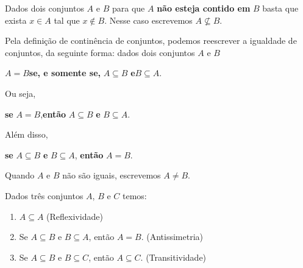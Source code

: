 \documentclass{beamer}
\begin{document}
    \begin{frame}

        \begin{observacao}
            Dados dois conjuntos $A$ e $B$ \pause para que $A$ \textbf{n\~ao esteja contido em} $B$ basta \pause que exista $x \in A$ tal que $x \notin B$. \pause Nesse caso escrevemos $A \nsubseteq B$.
        \end{observacao}
    \end{frame}
    \begin{frame}
        \vspace{.4cm}
        Pela defini\c{c}\~ao de contin\^encia de conjuntos, \pause podemos reescrever a igualdade de conjuntos, da seguinte forma: \pause dados dois conjuntos $A$ e $B$\pause
        \begin{center}
            $A = B$\quad \textbf{se, e somente se,} \pause\quad $A \subseteq B$ \quad\pause \textbf{e}\quad $B \subseteq A$.\pause
        \end{center}

        Ou seja,
        \begin{center}
            \textbf{se} $A = B$,\textbf{ent{\~a}o} $A \subseteq B$ \textbf{e} $B \subseteq A$.\pause
        \end{center}

        Al\'em disso,
        \begin{center}
            \textbf{se} $A \subseteq B$ \textbf{e} $B \subseteq A$, \textbf{ent{\~a}o} $A = B$.\pause
        \end{center}

        Quando $A$ e $B$ n{\~a}o s{\~a}o iguais, escrevemos $A \neq B$.\pause

        \begin{proposicao}
            Dados tr\^es conjuntos $A$, $B$ e $C$ temos:\pause
            \begin{enumerate}[label={\roman*})]
                \item $A\subseteq A$ (Reflexividade)\pause
                \item Se $A\subseteq B \mbox{ e } B\subseteq A$, ent{\~a}o $A=B$. (Antissimetria)\pause
                \item Se $A\subseteq B$ e $B\subseteq C$, ent{\~a}o $A\subseteq C$. (Transitividade)
            \end{enumerate}
        \end{proposicao}
    \end{frame}
\end{document}
